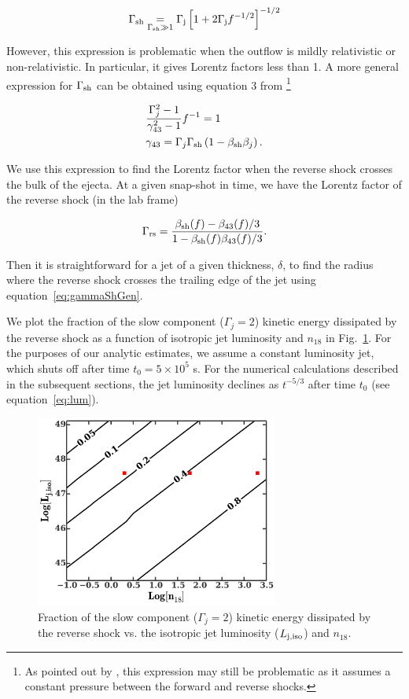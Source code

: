 \documentclass[usenatbib,fleqn]{mnras}
\begin{document}
\begin{equation}
\Gamma_{\rm sh} \underset{\Gamma_{\rm sh} \gg 1}= \Gamma_{\rm j}\left[1 + 2\Gamma_{\rm j}f^{-1/2}\right]^{-1/2}
\end{equation}

However, this expression is problematic when the outflow is mildly
relativistic or non-relativistic. In particular, it gives Lorentz
factors less than 1. A more general expression for $\Gamma_{\rm sh}$
can be obtained using equation 3 from
\citet{Beloborodov&Uhm2006}\footnote{As pointed out by
  \citet{Beloborodov&Uhm2006}, this expression may still be
  problematic as it assumes a constant pressure between the forward
  and reverse shocks.}

\begin{align}
&\frac{\Gamma_j^2-1}{\gamma_{43}^2-1} f^{-1}=1\\
&\gamma_{43}=\Gamma_j \Gamma_{\rm sh} \left(1-\beta_{\rm sh} \beta_j\right).
\label{eq:gammaShGen}
\end{align}

We use this expression to find the Lorentz factor when the reverse
shock crosses the bulk of the ejecta.  At a given snap-shot in time,
we have the Lorentz factor of the reverse shock (in the lab frame)

\begin{equation}
\Gamma_{\rm rs}=\frac{\beta_{\rm sh}(f)-\beta_{43}(f)/3}{1-\beta_{\rm
    sh}(f) \beta_{43}(f)/3}.
\end{equation} 

Then it is straightforward for a jet of a given thickness, $\delta$,
to find the radius where the reverse shock crosses the trailing edge
of the jet using equation~\eqref{eq:gammaShGen}.

We plot the fraction of the slow component ($\Gamma_j=2$) kinetic
energy dissipated by the reverse shock as a function of isotropic jet
luminosity and $n_{18}$ in Fig.~\ref{fig:diss}. For the purposes of
our analytic estimates, we assume a constant luminosity jet, which
shuts off after time $t_{0}=5 \times 10^{5}$ s. For the numerical
calculations described in the subsequent sections, the jet luminosity
declines as $t^{-5/3}$ after time $t_{0}$ (see equation~\ref{eq:lum}).

\begin{figure}
\includegraphics[width=8cm]{diss.pdf}
\caption{\label{fig:diss} Fraction of the slow component
  ($\Gamma_j=2$) kinetic energy dissipated by the reverse shock
  vs. the isotropic jet luminosity ($L_{\rm j,iso}$) and $n_{18}$.}
\end{figure}
\end{document}
